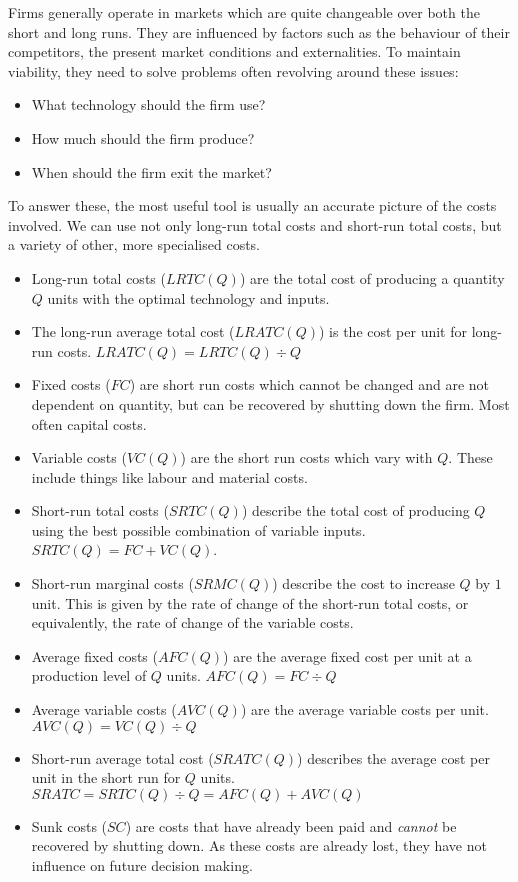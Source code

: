 \documentclass[12pt]{report}
\begin{document}
\begin{flushleft}
\bigskip
Firms generally operate in markets which are quite changeable over both the 
short and long runs. They are influenced by factors such as the behaviour of
their competitors, the present market conditions and externalities. To maintain
viability, they need to solve problems often revolving around these issues:
\begin{itemize}
    \item What technology should the firm use?
    \item How much should the firm produce?
    \item When should the firm exit the market?
\end{itemize}
To answer these, the most useful tool is usually an accurate picture of the 
costs involved. We can use not only long-run total costs and short-run total
costs, but a variety of other, more specialised costs.

\begin{itemize}
    \item Long-run total costs (\(LRTC(Q)\)) are the total cost of producing a
    quantity \(Q\) units with the optimal technology and inputs.
    \item The long-run average total cost (\(LRATC(Q)\)) is the cost per unit 
    for long-run costs. \(LRATC(Q) = LRTC(Q) \div Q\)
    \item Fixed costs (\(FC\)) are short run costs which cannot be changed and
    are not dependent on quantity, but can be recovered by shutting down the
    firm. Most often capital costs.
    \item Variable costs (\(VC(Q)\)) are the short run costs which vary with 
    \(Q\). These include things like labour and material costs.
    \item Short-run total costs (\(SRTC(Q)\)) describe the total cost of 
    producing \(Q\) using the best possible combination of variable inputs.
    \(SRTC(Q) = FC + VC(Q)\).
    \item Short-run marginal costs (\(SRMC(Q)\)) describe the cost to increase
    \(Q\) by \(1\) unit. This is given by the rate of change of the short-run
    total costs, or equivalently, the rate of change of the variable costs.
    \item Average fixed costs (\(AFC(Q)\)) are the average fixed cost per unit
    at a production level of \(Q\) units. \(AFC(Q) = FC \div Q\)
    \item Average variable costs (\(AVC(Q)\)) are the average variable costs
    per unit. \(AVC(Q) = VC(Q) \div Q\)
    \item Short-run average total cost (\(SRATC(Q)\)) describes the average 
    cost per unit in the short run for \(Q\) units. \(SRATC = SRTC(Q) \div Q
    = AFC(Q) + AVC(Q)\)
    \item Sunk costs (\(SC\)) are costs that have already been paid and 
    \textit{cannot} be recovered by shutting down. As these costs are already
    lost, they have not influence on future decision making. 
\end{itemize}


\end{flushleft}
\end{document}
